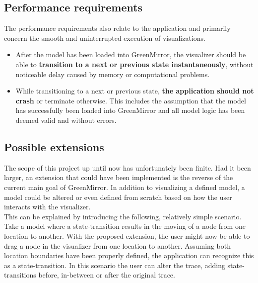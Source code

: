 \documentclass[a4paper]{article}
\begin{document}
	\subsection{Performance requirements}
	The performance requirements also relate to the application and primarily concern the smooth and uninterrupted execution of visualizations.
	\begin{itemize}
		\item After the model has been loaded into GreenMirror, the visualizer should be able to \textbf{transition to a next or previous state instantaneously}, without noticeable delay caused by memory or computational problems.
		\item While transitioning to a next or previous state, \textbf{the application should not crash} or terminate otherwise. This includes the assumption that the model has successfully been loaded into GreenMirror and all model logic has been deemed valid and without errors.
	\end{itemize}
	
	
	\subsection{Possible extensions}\label{subsec:possibleextensions}
	The scope of this project up until now has unfortunately been finite. Had it been larger, an extension that could have been implemented is the reverse of the current main goal of GreenMirror. In addition to visualizing a defined model, a model could be altered or even defined from scratch based on how the user interacts with the visualizer.
	\\This can be explained by introducing the following, relatively simple scenario. Take a model where a state-transition results in the moving of a node from one location to another. With the proposed extension, the user might now be able to drag a node in the visualizer from one location to another. Assuming both location boundaries have been properly defined, the application can recognize this as a state-transition. In this scenario the user can alter the trace, adding state-transitions before, in-between or after the original trace.
	
\end{document}
